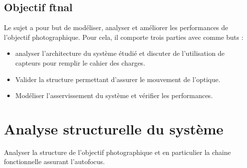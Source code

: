 \subsection{Objectif ftnal}\label{objectif-ftnal}

Le sujet a pour but de modéliser, analyser et améliorer les performances
de l'objectif photographique. Pour cela, il comporte trois parties avec
comme buts :


\begin{itemize}
\item analyser l'architecture du système étudié et discuter de l'utilisation de capteurs pour remplir le cahier des charges.
\item Valider la structure permettant d'assurer le mouvement de l'optique.
\item Modéliser l'asservissement du système et vérifier les performances.
\end{itemize}

%


\section{Analyse structurelle du système}

\begin{obj}
Analyser la structure de l'objectif photographique et en particulier la chaine fonctionnelle assurant l'autofocus.
\end{obj}

